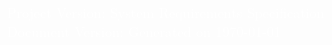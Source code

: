 \begin{flushright}
    \begin{bfseries}
    \begin{centering}
        \vspace{-1cm}
        \textcolor{white}{\HUGE{}}\\
    \end{centering}
    \end{bfseries}
        

        
\vfill
\textcolor{white}{Project Version: \projectversion \hfill System Requirements Specification} \\
\textcolor{white}{Document Version: \documentversion \hfill Generated on \today} \\
\end{flushright}

\BgThispage
